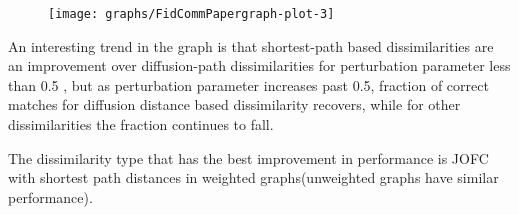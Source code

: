 \documentclass[12pt,oneside,final]{thesis}\usepackage[]{graphicx}\usepackage[]{color}
\begin{document}
  

\begin{figure}
\centering
\texttt{[image: graphs/FidCommPapergraph-plot-3]} 
\end{figure}



An interesting trend in the graph is that shortest-path based dissimilarities are an improvement over diffusion-path dissimilarities for perturbation parameter less than 0.5 , but as perturbation parameter increases past 0.5, fraction of correct matches for diffusion distance based dissimilarity recovers, while for other dissimilarities the fraction continues to fall. 

The dissimilarity type that has the best improvement in performance is JOFC with shortest path distances in weighted graphs(unweighted graphs have similar performance).
\end{document}

